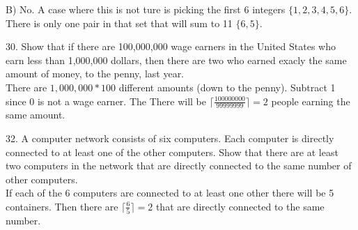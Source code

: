 \documentclass[12]{article}
\begin{document}
B) No. A case where this is not ture is picking the first 6 integers $\{1,2,3,4,5,6\}$.  There is only one pair in that set that will sum to 11 $\{6,5\}$.\\


\hrulefill


30. Show that if there are 100,000,000 wage earners in the United States who earn less than
1,000,000 dollars, then there are two who earned exacly the same amount of money, to the
penny, last year.\\

There are $1,000,000 * 100$ different amounts (down to the penny).  Subtract 1 since 0 is not a wage earner.  The There will be $\lceil\frac{100000000}{99999999}\rceil = 2$ people earning the same amount.\\

\hrulefill

32. A computer network consists of six computers. Each computer is directly connected to at least one of the other computers. Show that there are at least two computers in the network that are directly connected to the same number of other computers.\\

If each of the 6 computers are connected to at least one other there will be 5 containers.  Then there are $\lceil\frac{6}{5}\rceil = 2$ that are directly connected to the same number. 
 
\end{document}
